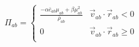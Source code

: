 \documentclass[12pt]{article}
\begin{document}
\[
  \Pi_{ab} = \begin{cases} \frac{-\alpha \bar{c}_{ab} \mu_{ab} + \beta \mu_{ab}^2}{\bar{\rho}_{ab}} & \vec{v}_{ab} \cdot \vec{r}_{ab} < 0 \\
                                                        0  &  \vec{v}_{ab} \cdot \vec{r}_{ab} \geq 0 \\
                                          \end{cases}
\] 
\end{document}
